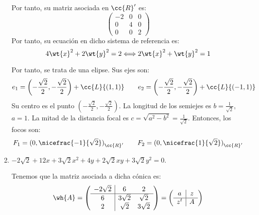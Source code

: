 \begin{ejercicio}
\begin{enumerate}
        
        Por tanto, su matriz asociada en $\cc{R}'$ es:
        \begin{equation*}
            \left(\begin{array}{c|cc}
                -2 & 0 & 0  \\ \hline
                0 & 4 & 0 \\
                0 & 0 & 2
            \end{array}\right)
        \end{equation*}
        Por tanto, su ecuación en dicho sistema de referencia es:
        \begin{equation*}
            4\wt{x}^2 +2\wt{y}^2 = 2 \Longleftrightarrow 2\wt{x}^2 +\wt{y}^2=1
        \end{equation*}

        Por tanto, se trata de una elipse. Sus ejes son:
        \begin{equation*}
            e_1 = \left(-\frac{\sqrt{2}}{2},-\frac{\sqrt{2}}{2}\right) + \cc{L}\{(1,1)\}
            \qquad
            e_2 = \left(-\frac{\sqrt{2}}{2},-\frac{\sqrt{2}}{2}\right) + \cc{L}\{(-1,1)\}
        \end{equation*}
        Su centro es el punto $\left(-\frac{\sqrt{2}}{2},-\frac{\sqrt{2}}{2}\right)$. La longitud de los semiejes es $b=\frac{1}{\sqrt{2}}$, $a=1$. La mitad de la distancia focal es $c=\sqrt{a^2-b^2}=\frac{1}{\sqrt{2}}$. Entonces, los focos son:
        \begin{equation*}
            F_1={(0,\nicefrac{-1}{\sqrt{2}})}_{\cc{R}'}
            \qquad
            F_2={(0,\nicefrac{1}{\sqrt{2}})}_{\cc{R}'}
        \end{equation*}
        
        \item $-2\sqrt{2} + 12 x + 3\sqrt{2}x^2 + 4 y + 2\sqrt{2} x y + 3\sqrt{2}y^2=0$.
    
        Tenemos que la matriz asociada a dicha cónica es:
        \begin{equation*}
            \wh{A} = \left(\begin{array}{c|cc}
                -2\sqrt{2} & 6 & 2  \\ \hline
                6 & 3\sqrt{2} & \sqrt{2} \\
                2 &  \sqrt{2} & 3\sqrt{2}
            \end{array}\right)
            = \left(\begin{array}{c|c}
                a & z \\ \hline
                z^t & A
            \end{array}\right)
        \end{equation*}
        

\end{enumerate}
\end{ejercicio}
